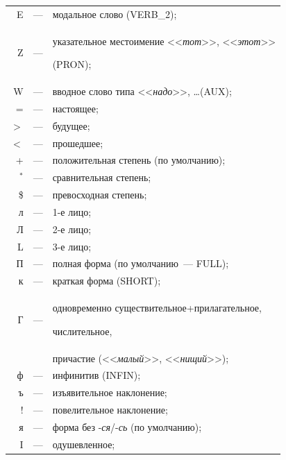 \begin{tabular}{rcl}
    E&---& модальное слово (VERB\_2);\\

    Z&---& указательное местоимение <<\textit{тот}>>, <<\textit{этот}>>

(PRON);\\

    W&---& вводное слово типа <<\textit{надо}>>, \ldots  (AUX);\\

    =&---& настоящее;\\

    $>$&---& будущее;\\

    $<$&---& прошедшее;\\

    +&---& положительная степень (по умолчанию);\\

    $^*$&---& сравнительная степень;\\

    \$&---& превосходная степень;\\

    л&---& 1-е лицо;\\

    Л&---& 2-е лицо;\\

    L&---& 3-е лицо;\\

    П&---& полная форма (по умолчанию~--- FULL);\\

    к&---& краткая форма (SHORT);\\

    Г&---& одновременно существительное\;+\;при\-ла\-га\-тель\-ное,

числительное,\\

&& причастие (<<\textit{малый}>>, <<\textit{нищий}>>);\\

    ф&---& инфинитив (INFIN);\\

    ъ&---& изъявительное наклонение;\\

    !&---& повелительное наклонение;\\

    я&---& форма без -\textit{ся}/-\textit{сь} (по умолчанию);\\

    I&---& одушевленное;

    \end{tabular}



